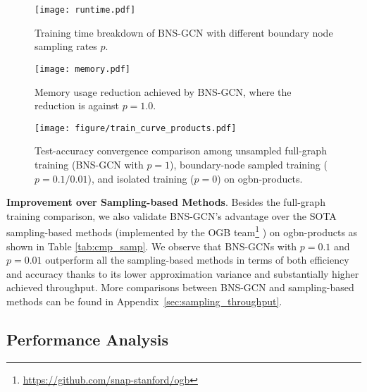 \documentclass{article}
\newcommand{\niparagraph}[1]{\noindent\textbf{#1}}
\begin{document}
\renewcommand{\thefootnote}{\fnsymbol{footnote}}
\renewcommand{\thefootnote}{\arabic{footnote}}

\begin{figure*}[t]
\centering
\begin{minipage}{.5\textwidth}
  \centering
  \texttt{[image: runtime.pdf]}
  \caption{Training time breakdown of BNS-GCN with different boundary node sampling rates $p$.} 
  \label{fig:comm}
\end{minipage}\begin{minipage}{.5\textwidth}
  \centering
  \texttt{[image: memory.pdf]}
  \caption{Memory usage reduction achieved by BNS-GCN, where the reduction is against $p=1.0$.}
  \label{fig:mem}
\end{minipage}
\end{figure*}


\begin{figure*}[t]
  \centering
  \texttt{[image: figure/train\_curve\_products.pdf]}
  \caption{Test-accuracy convergence comparison among unsampled full-graph training (BNS-GCN with $p=1$), boundary-node sampled training ($p=0.1/0.01$), and isolated training ($p=0$) on ogbn-products.} 
  \label{fig:convergence_epoch}
\end{figure*}


\niparagraph{Improvement over Sampling-based Methods}.
Besides the full-graph training comparison, we also validate BNS-GCN's advantage over the SOTA sampling-based methods (implemented by the OGB team\footnote{\href{https://github.com/snap-stanford/ogb}{https://github.com/snap-stanford/ogb}} \citep{hu2020open}) on ogbn-products as shown in Table \ref{tab:cmp_samp}.
We observe that BNS-GCNs with $p=0.1$ and $p=0.01$ outperform all the sampling-based methods in terms of both efficiency and accuracy thanks to its lower approximation variance and substantially higher achieved throughput. 
More comparisons between BNS-GCN and sampling-based methods can be found in Appendix~\ref{sec:sampling_throughput}.


\subsection{Performance Analysis}
\end{document}
